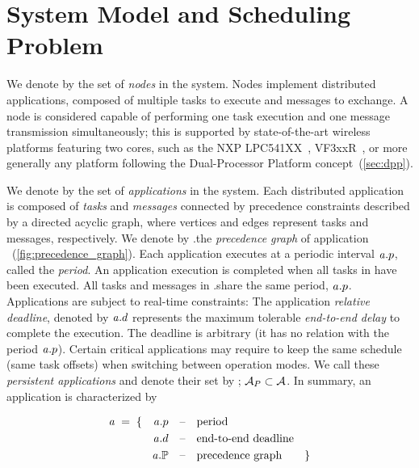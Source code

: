 
\section{System Model and Scheduling Problem}
\label{sec:model}

We denote by \nodeset the set of \emph{nodes} in the system.
Nodes implement distributed applications, composed of multiple tasks to execute and  messages to exchange.
A node is considered capable of performing one task execution and one message transmission simultaneously; this is supported by state-of-the-art wireless \cps platforms featuring two cores, such as the NXP LPC541XX~\cite{nxpLPC541XX}, VF3xxR~\cite{nxpVF3xxR}, or more generally any platform following the Dual-Processor Platform concept~(\cref{sec:dpp}).

We denote by \appset the set of \emph{applications} in the system.
Each distributed application is composed of \emph{tasks} and \emph{messages} connected by precedence constraints described by a directed acyclic graph, where vertices and edges represent tasks and messages, respectively. We denote by \app.\predG the \emph{precedence graph} of application \app~(\cref{fig:precedence_graph}).
Each application executes at a periodic interval $\mathit{a_{}}.p$, called the \emph{period}.
An application execution is completed when all tasks in \predG have been executed.
All tasks and messages in \app.\predG share the same period, $\mathit{a_{}}.p$.
Applications are subject to real-time constraints: The application \emph{relative deadline}, denoted by $\mathit{a_{}}.d$ represents the maximum tolerable \emph{end-to-end delay} to complete the execution. The deadline is arbitrary (\ie it has no relation with the period $\mathit{a_{}}.p$).
Certain critical applications may require to keep the same schedule (\eg same task offsets) when switching between operation modes.
We call these \emph{persistent applications} and denote their set by \persappset; $\mathcal{A}_{P} \subset \mathcal{A}$.
In summary, an application \app is characterized by

\pagebreak

\begin{align*}
\mathit{a_{}} \; = \; \{ \quad
	 \mathit{a_{}}.p
	\quad &\text{--\quad period} \\
	 \mathit{a_{}}.d
	\quad &\text{--\quad end-to-end deadline} \\
	 \mathit{a_{}}.\mathbb{P}
	\quad &\text{--\quad precedence graph} \quad\quad \}
\end{align*}


